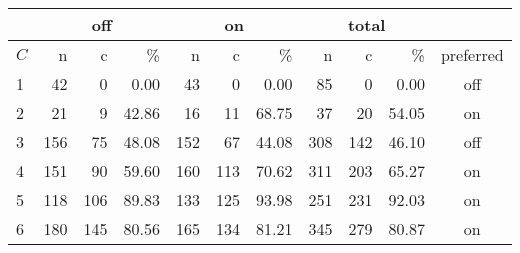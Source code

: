 \begin{tabular}{| l |  rrr| rrr| rrr| c|}
\cline{2-10}
\multicolumn{1}{l}{} & \multicolumn{3}{|c|}{off} & \multicolumn{3}{|c|}{on} & \multicolumn{3}{|c|}{total} \\
\hline
 $C$ & n & c & \% & n & c & \% & n & c & \% & preferred \\
\hline
1 & 42  & 0   & 0.00  & 43  & 0   & 0.00  & 85  & 0   & 0.00  & off \\
2 & 21  & 9   & 42.86 & 16  & 11  & 68.75 & 37  & 20  & 54.05 & on  \\
3 & 156 & 75  & 48.08 & 152 & 67  & 44.08 & 308 & 142 & 46.10 & off \\
4 & 151 & 90  & 59.60 & 160 & 113 & 70.62 & 311 & 203 & 65.27 & on  \\
5 & 118 & 106 & 89.83 & 133 & 125 & 93.98 & 251 & 231 & 92.03 & on  \\
6 & 180 & 145 & 80.56 & 165 & 134 & 81.21 & 345 & 279 & 80.87 & on  \\
\hline
\end{tabular}

